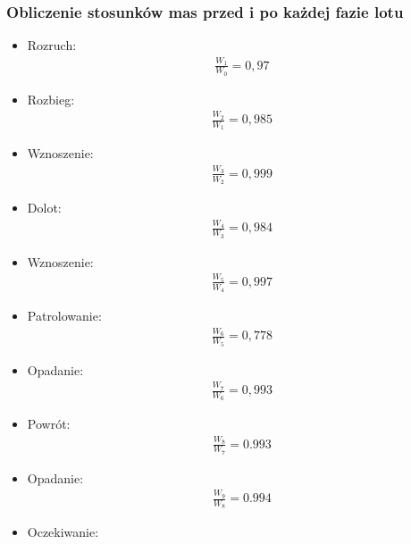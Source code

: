        \subsubsection{Obliczenie stosunków mas przed i po każdej fazie lotu}
        \begin{itemize}
            \item Rozruch:
                \begin{align}
                    \frac{W_{1}}{W_{0}}=0,97
                \end{align}
            \item Rozbieg:
                \begin{align}
                    \frac{W_{2}}{W_{1}}=0,985
                \end{align}
            \item Wznoszenie:
                \begin{align}
                    \frac{W_{3}}{W_{2}}=0,999
                \end{align}           
            \item Dolot:
                \begin{align}
                    \frac{W_{4}}{W_{3}}=0,984
                \end{align} 
            \item Wznoszenie:
                \begin{align}
                    \frac{W_{5}}{W_{4}}=0,997
                \end{align}  
            \item Patrolowanie:
                \begin{align}
                    \frac{W_{6}}{W_{5}}=0,778
                \end{align}
            \item Opadanie:
                \begin{align}
                    \frac{W_{7}}{W_{6}}=0,993
                \end{align}  
            \item Powrót:
                \begin{align}
                    \frac{W_{8}}{W_{7}}=0.993
                \end{align}  
            \item Opadanie:
                \begin{align}
                    \frac{W_{9}}{W_{8}}=0.994
                \end{align}  
            \item Oczekiwanie:

\end{itemize}
